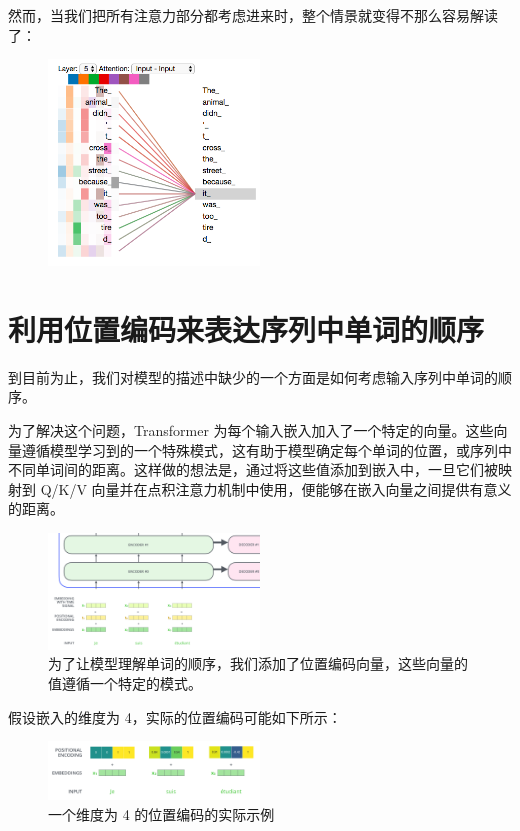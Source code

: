 \documentclass[cn,hazy,blue,10pt,normal]{elegantnote}
\begin{document}
然而，当我们把所有注意力部分都考虑进来时，整个情景就变得不那么容易解读了：
\begin{figure}[ht]
	\centering
	\includegraphics[width=0.5\textwidth]{image/transformer_self-attention_visualization_3.png}
\end{figure}

\newpage

\section{利用位置编码来表达序列中单词的顺序}

到目前为止，我们对模型的描述中缺少的一个方面是如何考虑输入序列中单词的顺序。

为了解决这个问题，Transformer 为每个输入嵌入加入了一个特定的向量。这些向量遵循模型学习到的一个特殊模式，这有助于模型确定每个单词的位置，或序列中不同单词间的距离。这样做的想法是，通过将这些值添加到嵌入中，一旦它们被映射到 Q/K/V 向量并在点积注意力机制中使用，便能够在嵌入向量之间提供有意义的距离。

\begin{figure}[ht]
	\centering
	\includegraphics[width=0.5\textwidth]{image/transformer_positional_encoding_vectors.png}
	\caption{为了让模型理解单词的顺序，我们添加了位置编码向量，这些向量的值遵循一个特定的模式。}
\end{figure}

假设嵌入的维度为 4，实际的位置编码可能如下所示：

\begin{figure}[ht]
	\centering
	\includegraphics[width=0.5\textwidth]{image/transformer_positional_encoding_example.png}
	\caption{一个维度为 4 的位置编码的实际示例}
\end{figure}
\end{document}
